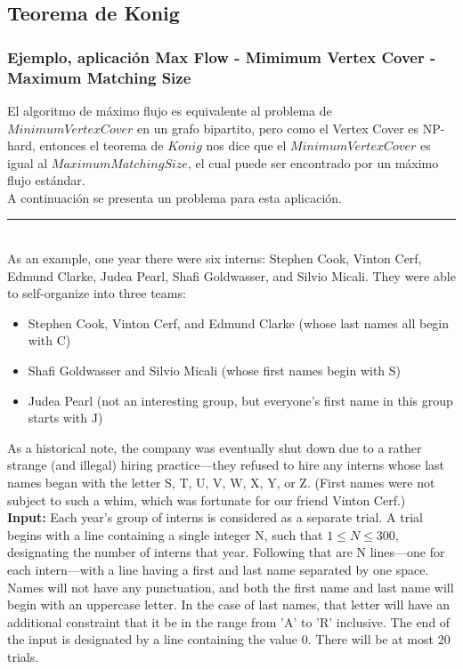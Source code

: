 \documentclass[10pt,letterpaper,twocolumn]{article}
\begin{document}
  \subsection{Teorema de Konig}
    \subsubsection{Ejemplo, aplicación Max Flow - Mimimum Vertex Cover - Maximum Matching Size}
    El algoritmo de máximo flujo es equivalente al problema de $Minimum Vertex Cover$ en un grafo bipartito, pero como el Vertex Cover es NP-hard, entonces el teorema de $Konig$ nos dice que el $Minimum Vertex Cover$ es igual al $Maximum Matching Size$, el cual puede ser encontrado por un máximo flujo estándar.\\
    A continuación se presenta un problema para esta aplicación.\\
\rule{12cm}{.1pt}\\
    As an example, one year there were six interns: Stephen Cook, Vinton Cerf, Edmund Clarke, Judea Pearl, Shafi Goldwasser, and Silvio Micali. They were able to self-organize into three teams:
    \begin{itemize}
      \item Stephen Cook, Vinton Cerf, and Edmund Clarke (whose last names all begin with C)
      \item Shafi Goldwasser and Silvio Micali (whose first names begin with S)
      \item Judea Pearl (not an interesting group, but everyone's first name in this group starts with J)
    \end{itemize}
As a historical note, the company was eventually shut down due to a rather strange (and illegal) hiring practice---they refused to hire any interns whose last names began with the letter S, T, U, V, W, X, Y, or Z. (First names were not subject to such a whim, which was fortunate for our friend Vinton Cerf.)\\
\textbf{Input:}  Each year's group of interns is considered as a separate trial. A trial begins with a line containing a single integer N, such that $1 \leq N \leq 300$, designating the number of interns that year. Following that are N lines---one for each intern---with a line having a first and last name separated by one space. Names will not have any punctuation, and both the first name and last name will begin with an uppercase letter. In the case of last names, that letter will have an additional constraint that it be in the range from 'A' to 'R' inclusive. The end of the input is designated by a line containing the value 0. There will be at most 20 trials.\\
\end{document}
